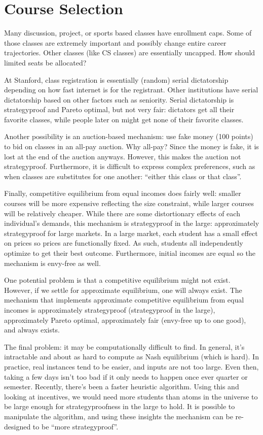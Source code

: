 \documentclass[dvipsnames]{article}
\theoremstyle{definition}
\theoremstyle{remark}
\begin{document}
\newpage

\section{Course Selection}

Many discussion, project, or sports based classes have enrollment caps. Some of those classes are extremely important and possibly change entire career trajectories. Other classes (like CS classes) are essentially uncapped. How should limited seats be allocated?

At Stanford, class registration is essentially (random) serial dictatorship depending on how fast internet is for the registrant. Other institutions have serial dictatorship based on other factors such as seniority. Serial dictatorship is strategyproof and Pareto optimal, but not very fair: dictators get all their favorite classes, while people later on might get none of their favorite classes. 

Another possibility is an auction-based mechanism: use fake money (100 points) to bid on classes in an all-pay auction. Why all-pay? Since the money is fake, it is lost at the end of the auction anyways. However, this makes the auction not strategyproof. Furthermore, it is difficult to express complex preferences, such as when classes are substitutes for one another: ``either this class or that class''.

Finally, competitive equilibrium from equal incomes does fairly well: smaller courses will be more expensive reflecting the size constraint, while larger courses will be relatively cheaper. While there are some distortionary effects of each individual's demands, this mechanism is strategyproof in the large: approximately strategyproof for large markets. In a large market, each student has a small effect on prices so prices are functionally fixed. As such, students all independently optimize to get their best outcome. Furthermore, initial incomes are equal so the mechanism is envy-free as well.

One potential problem is that a competitive equilibrium might not exist. However, if we settle for approximate equilibrium, one will always exist. The mechanism that implements approximate competitive equilibrium from equal incomes is approximately strategyproof (strategyproof in the large), approximately Pareto optimal, approximately fair (envy-free up to one good), and always exists.

The final problem: it may be computationally difficult to find. In general, it's intractable and about as hard to compute as Nash equilibrium (which is hard). In practice, real instances tend to be easier, and inputs are not too large. Even then, taking a few days isn't too bad if it only needs to happen once ever quarter or semester. Recently, there's been a faster heuristic algorithm. Using this and looking at incentives, we would need more students than atoms in the universe to be large enough for strategyproofness in the large to hold. It is possible to manipulate the algorithm, and using these insights the mechanism can be re-designed to be ``more strategyproof''.
\end{document}
